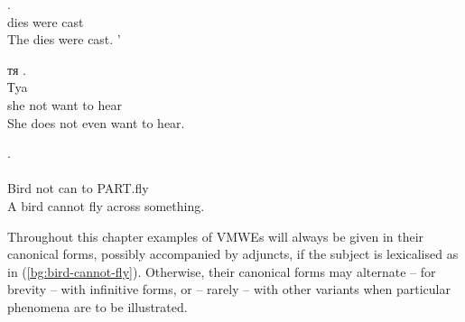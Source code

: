 \documentclass[output=paper,
modfonts,
]{langscibook}
\begin{document}
\ea \label{pl:kosci-zostaly-rzucone}
\settowidth {} 
\gll {}  .\\
dies were cast \\ 
\glt The dies were cast. ’
\z

\ea \label{bg:not-want-hear}
\settowidth {} 
\glll тя    . \\
Тya     \\
she  not want to hear \\ 
\glt She does not even want to hear. 
\z

\ea \label{bg:bird-cannot-fly}
\settowidth {} 
\glll {}    .\\
     \\
{Bird} {not} {can} {to} {\textsc{PART}.fly} \\ 
\glt A bird cannot fly across something. 
\z

Throughout this chapter examples of VMWEs will always be given in their canonical forms, possibly accompanied by adjuncts, if the subject is lexicalised as in (\ref{bg:bird-cannot-fly}).
Otherwise, their canonical forms may alternate -- for brevity -- with infinitive forms, or -- rarely -- with other variants when particular phenomena are to be illustrated.


\end{document}
